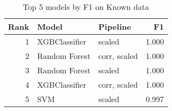 \begin{table}[!htb]
\centering
\begin{tabular}{rllr}
\toprule
Rank & Model & Pipeline & F1 \\
\midrule
1 & XGBClassifier & scaled & 1.000 \\
2 & Random Forest & corr, scaled & 1.000 \\
3 & Random Forest & scaled & 1.000 \\
4 & XGBClassifier & corr, scaled & 1.000 \\
5 & SVM & scaled & 0.997 \\
\bottomrule
\end{tabular}
\caption{Top 5 models by F1 on Known data}
\label{table-top-5-f1-known}
\end{table}
